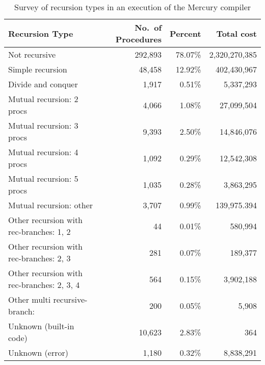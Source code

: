 \begin{table}
\begin{tabular}{l|rrr}
Recursion Type & No.\ of Procedures & Percent & Total cost \\
\hline
Not recursive  &            292,893 & 78.07\% & 2,320,270,385 \\
Simple recursion&            48,458 & 12.92\% &   402,430,967 \\
Divide and conquer&           1,917 &  0.51\% &     5,337,293 \\
Mutual recursion: 2 procs &   4,066 &  1.08\% &    27,099,504 \\
Mutual recursion: 3 procs &   9,393 &  2.50\% &    14,846,076 \\
Mutual recursion: 4 procs &   1,092 &  0.29\% &    12,542,308 \\
Mutual recursion: 5 procs &   1,035 &  0.28\% &     3,863,295 \\
Mutual recursion: other   &   3,707 &  0.99\% &   139,975.394 \\

Other recursion with rec-branches: 1, 2
                           &     44 &  0.01\% &       580,994 \\
Other recursion with rec-branches: 2, 3
                           &    281 &  0.07\% &       189,377 \\
Other recursion with rec-branches: 2, 3, 4
                           &    564 &  0.15\% &     3,902,188 \\
Other multi recursive-branch:
                           &    200 &  0.05\% &         5,908 \\
Unknown (built-in code)    & 10,623 &  2.83\% &           364 \\
Unknown (error)            &  1,180 &  0.32\% &     8,838,291 \\
\end{tabular}
\caption{Survey of recursion types in an execution of the Mercury compiler}
\label{tab:recursion_types}
\end{table}

